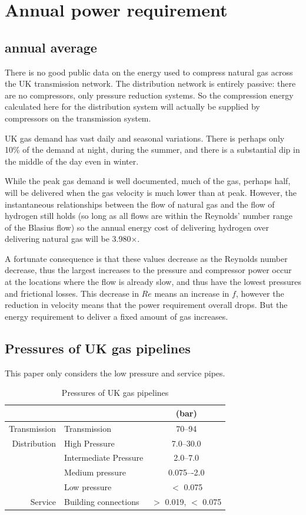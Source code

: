 \documentclass[5p]{elsarticle} %
\begin{document}
\section{Annual power requirement}
\subsection{annual average}
There is no good public data on the energy used to compress natural gas across the UK transmission network. 
The distribution network is entirely passive: there are no compressors, only pressure reduction systems. So the compression energy calculated here for the distribution system will actually be supplied by compressors on the transmission system.

UK gas demand has vast daily and seasonal variations. There is perhaps only 10\% of the demand at night, during the summer, and there is a substantial dip in the middle of the day even in winter.

While the peak gas demand is well documented, much of the gas, perhaps half, will be delivered when the gas velocity is much lower than at peak. However, the instantaneous relationships between the flow of natural gas and the flow of hydrogen still holds (so long as all flows are within the Reynolds' number range of the Blasius flow) so the annual energy cost of delivering hydrogen over delivering natural gas will be 3.980$\times$.

A fortunate consequence is that these values decrease as the Reynolds number decrease, thus the largest increases to the pressure and compressor power occur at the locations where the flow is already slow, and thus have the lowest pressures and frictional losses.
This decrease in $Re$ means an increase in $f$, however the reduction in velocity means that the power requirement overall drops. But the energy requirement to deliver a fixed amount of gas increases.

\subsection{Pressures of UK gas pipelines}
This paper only considers the low pressure and service pipes.
\begin{table}[htb]
\begin{tabular}{r|l|c}
 & & (bar) \\\hline
Transmission & Transmission& 70--94\\
\hline
Distribution & High Pressure & 7.0--30.0\\
& Intermediate Pressure & 2.0--7.0\\
& Medium pressure &	0.075–-2.0\\
& Low pressure & $<$ 0.075\\
\hline
Service & Building connections & $>$ 0.019, $<$ 0.075
\end{tabular}
\caption{\label{tab:pipeline}Pressures of UK gas pipelines\citep{dodds2013}}
\end{table}
\end{document}
